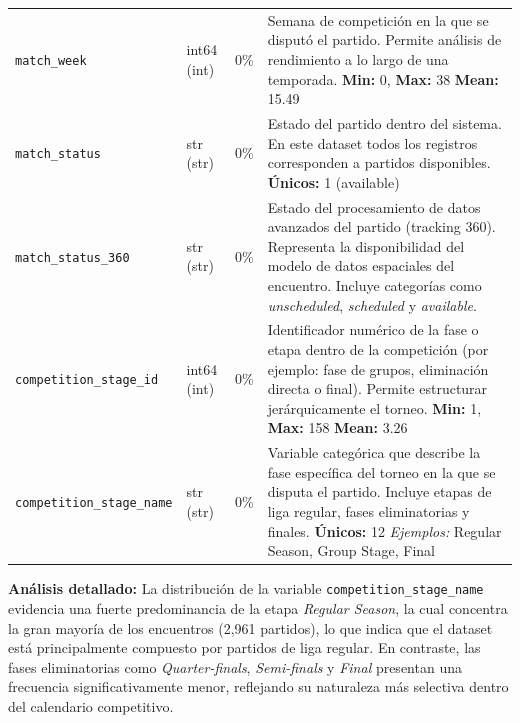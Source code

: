 \documentclass[12pt,a4paper]{article}
\begin{document}
\begin{center}
\begin{longtable}{T{4.5cm} C{2.5cm} C{0.8cm} p{7.0cm}}
\texttt{match\_week} & int64 \newline (int) & 0\% & Semana de competición en la que se disputó el partido. Permite análisis de rendimiento a lo largo de una temporada. \newline \textbf{Min:} 0, \textbf{Max:} 38 \newline \textbf{Mean:} 15.49 \\

\texttt{match\_status} & str \newline (str) & 0\% & Estado del partido dentro del sistema. En este dataset todos los registros corresponden a partidos disponibles. \newline \textbf{Únicos:} 1 (available) \\

\texttt{match\_status\_360} & str \newline (str) & 0\% & Estado del procesamiento de datos avanzados del partido (tracking 360). Representa la disponibilidad del modelo de datos espaciales del encuentro. Incluye categorías como \textit{unscheduled}, \textit{scheduled} y \textit{available}. \\

\texttt{competition\_stage\_id} & int64 \newline (int) & 0\% & Identificador numérico de la fase o etapa dentro de la competición (por ejemplo: fase de grupos, eliminación directa o final). Permite estructurar jerárquicamente el torneo. \newline \textbf{Min:} 1, \textbf{Max:} 158 \newline \textbf{Mean:} 3.26 \\

\texttt{competition\_stage\_name} & str \newline (str) & 0\% & Variable categórica que describe la fase específica del torneo en la que se disputa el partido. Incluye etapas de liga regular, fases eliminatorias y finales. \newline \textbf{Únicos:} 12 \newline \textit{Ejemplos:} Regular Season, Group Stage, Final \\
\bottomrule
\end{longtable}
\end{center}

\vspace{0.3cm}
\textbf{Análisis detallado:} 
La distribución de la variable \texttt{competition\_stage\_name} evidencia una fuerte predominancia de la etapa \textit{Regular Season}, la cual concentra la gran mayoría de los encuentros (2,961 partidos), lo que indica que el dataset está principalmente compuesto por partidos de liga regular. En contraste, las fases eliminatorias como \textit{Quarter-finals}, \textit{Semi-finals} y \textit{Final} presentan una frecuencia significativamente menor, reflejando su naturaleza más selectiva dentro del calendario competitivo.
\end{document}
